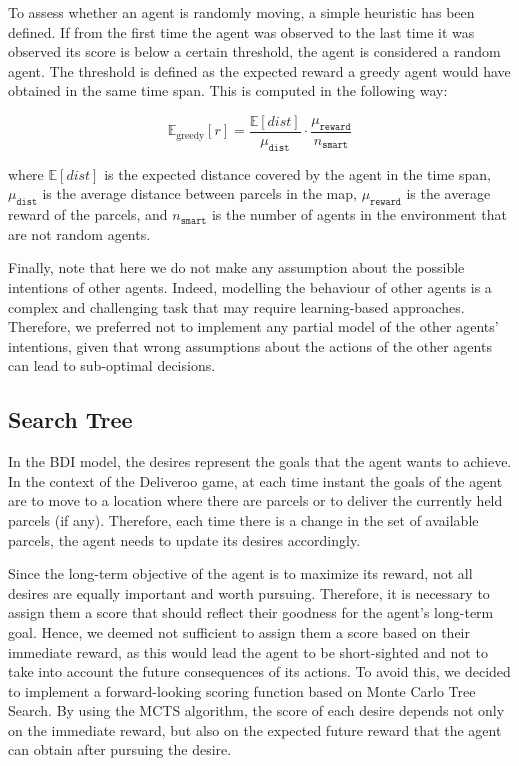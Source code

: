 To assess whether an agent is randomly moving, a simple heuristic has been defined. If from the first time the agent was observed to the last time it was observed its score is below a certain threshold, the agent is considered a random agent. The threshold is defined as the expected reward a greedy agent would have obtained in the same time span. This is computed in the following way:

\begin{equation*}
    \mathbb{E}_{\text{greedy}}[r] = \frac{\mathbb{E}[dist]}{\mu_{\texttt{dist}}} \cdot \frac{\mu_{\texttt{reward}}}{n_{\texttt{smart}}}
\end{equation*}

where $\mathbb{E}[dist]$ is the expected distance covered by the agent in the time span, $\mu_{\texttt{dist}}$ is the average distance between parcels in the map, $\mu_{\texttt{reward}}$ is the average reward of the parcels, and $n_{\texttt{smart}}$ is the number of agents in the environment that are not random agents.

Finally, note that here we do not make any assumption about the possible intentions of other agents. Indeed, modelling the behaviour of other agents is a complex and challenging task that may require learning-based approaches. Therefore, we preferred not to implement any partial model of the other agents' intentions, given that wrong assumptions about the actions of the other agents can lead to sub-optimal decisions.


\subsection{Search Tree}
\label{sec:search}

In the BDI model, the desires represent the goals that the agent wants to achieve. In the context of the Deliveroo game, at each time instant the goals of the agent are to move to a location where there are parcels or to deliver the currently held parcels (if any). Therefore, each time there is a change in the set of available parcels, the agent needs to update its desires accordingly.

Since the long-term objective of the agent is to maximize its reward, not all desires are equally important and worth pursuing. Therefore, it is necessary to assign them a score that should reflect their goodness for the agent's long-term goal. Hence, we deemed not sufficient to assign them a score based on their immediate reward, as this would lead the agent to be short-sighted and not to take into account the future consequences of its actions. To avoid this, we decided to implement a forward-looking scoring function based on Monte Carlo Tree Search. By using the MCTS algorithm, the score of each desire depends not only on the immediate reward, but also on the expected future reward that the agent can obtain after pursuing the desire.

